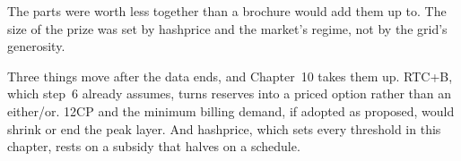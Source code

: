 \enlargethispage{3\baselineskip}
The parts were worth less together than a brochure would add them up to. The size of the prize was set by hashprice and the market's regime, not by the grid's generosity.

Three things move after the data ends, and Chapter~10 takes them up. RTC+B, which step~6 already assumes, turns reserves into a priced option rather than an either/or. 12CP and the minimum billing demand, if adopted as proposed, would shrink or end the peak layer. And hashprice, which sets every threshold in this chapter, rests on a subsidy that halves on a schedule.
